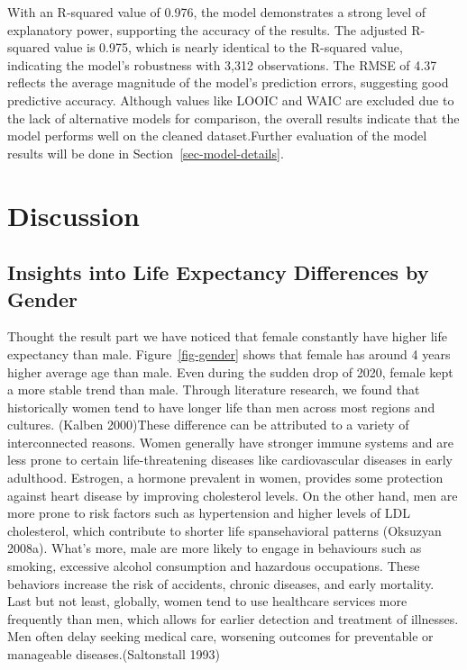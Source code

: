 \documentclass[
  letterpaper,
  DIV=11,
  numbers=noendperiod]{scrartcl}
\begin{document}
With an R-squared value of 0.976, the model demonstrates a strong level
of explanatory power, supporting the accuracy of the results. The
adjusted R-squared value is 0.975, which is nearly identical to the
R-squared value, indicating the model's robustness with 3,312
observations. The RMSE of 4.37 reflects the average magnitude of the
model's prediction errors, suggesting good predictive accuracy. Although
values like LOOIC and WAIC are excluded due to the lack of alternative
models for comparison, the overall results indicate that the model
performs well on the cleaned dataset.Further evaluation of the model
results will be done in Section~\ref{sec-model-details}.

\section{Discussion}\label{sec-discussion}

\subsection{Insights into Life Expectancy Differences by
Gender}\label{insights-into-life-expectancy-differences-by-gender}

Thought the result part we have noticed that female constantly have
higher life expectancy than male. Figure~\ref{fig-gender} shows that
female has around 4 years higher average age than male. Even during the
sudden drop of 2020, female kept a more stable trend than male. Through
literature research, we found that historically women tend to have
longer life than men across most regions and cultures. (Kalben
2000)These difference can be attributed to a variety of interconnected
reasons. Women generally have stronger immune systems and are less prone
to certain life-threatening diseases like cardiovascular diseases in
early adulthood. Estrogen, a hormone prevalent in women, provides some
protection against heart disease by improving cholesterol levels. On the
other hand, men are more prone to risk factors such as hypertension and
higher levels of LDL cholesterol, which contribute to shorter life
spansehavioral patterns (Oksuzyan 2008a). What's more, male are more
likely to engage in behaviours such as smoking, excessive alcohol
consumption and hazardous occupations. These behaviors increase the risk
of accidents, chronic diseases, and early mortality. Last but not least,
globally, women tend to use healthcare services more frequently than
men, which allows for earlier detection and treatment of illnesses. Men
often delay seeking medical care, worsening outcomes for preventable or
manageable diseases.(Saltonstall 1993)
\end{document}
